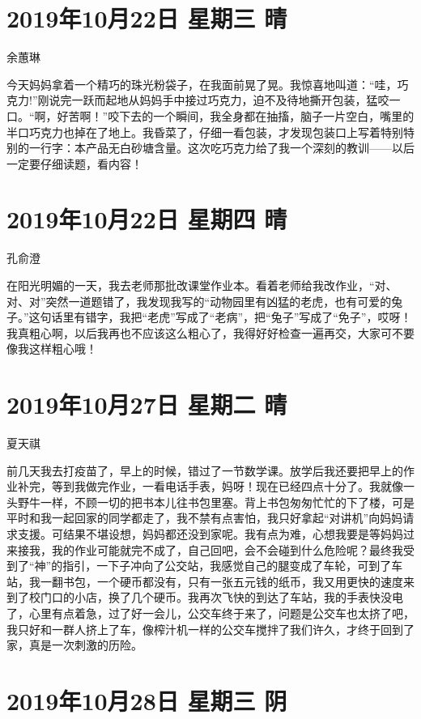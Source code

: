 \section{2019年10月22日 星期三 晴}

余蕙琳

今天妈妈拿着一个精巧的珠光粉袋子，在我面前晃了晃。我惊喜地叫道：``哇，巧克力!''刚说完一跃而起地从妈妈手中接过巧克力，迫不及待地撕开包装，猛咬一口。``啊，好苦啊！''咬下去的一个瞬间，我全身都在抽搐，脑子一片空白，嘴里的半口巧克力也掉在了地上。我昏菜了，仔细一看包装，才发现包装口上写着特别特别的一行字：本产品无白砂塘含量。这次吃巧克力给了我一个深刻的教训------以后一定要仔细读题，看内容！

\section{2019年10月22日 星期四 晴}

孔俞澄

在阳光明媚的一天，我去老师那批改课堂作业本。看着老师给我改作业，``对、对、对''突然一道题错了，我发现我写的``动物园里有凶猛的老虎，也有可爱的兔子。''这句话里有错字，我把``老虎''写成了``老病''，把``兔子''写成了``免子''，哎呀！我真粗心啊，以后我再也不应该这么粗心了，我得好好检查一遍再交，大家可不要像我这样粗心哦！

\section{2019年10月27日 星期二 晴}

夏天祺

前几天我去打疫苗了，早上的时候，错过了一节数学课。放学后我还要把早上的作业补完，等到我做完作业，一看电话手表，妈呀！现在已经四点十分了。我就像一头野牛一样，不顾一切的把书本儿往书包里塞。背上书包匆匆忙忙的下了楼，可是平时和我一起回家的同学都走了，我不禁有点害怕，我只好拿起``对讲机''向妈妈请求支援。可结果不堪设想，妈妈都还没到家呢。我有点为难，心想我要是等妈妈过来接我，我的作业可能就完不成了，自己回吧，会不会碰到什么危险呢？最终我受到了``神''的指引，一下子冲向了公交站，我感觉自己的腿变成了车轮，可到了车站，我一翻书包，一个硬币都没有，只有一张五元钱的纸币，我又用更快的速度来到了校门口的小店，换了几个硬币。我再次飞快的到达了车站，我的手表快没电了，心里有点着急，过了好一会儿，公交车终于来了，问题是公交车也太挤了吧，我只好和一群人挤上了车，像榨汁机一样的公交车搅拌了我们许久，才终于回到了家，真是一次刺激的历险。

\section{2019年10月28日 星期三 阴}

